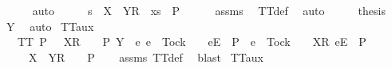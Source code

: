 \ \ \ \ \isamarkupfalse%
\ auto\isanewline
\ \ \isamarkupfalse%
\ \isamarkupfalse%
\ {\isachardoublequoteopen}s\ {\isacharat}\ {\isacharbrackleft}{\isacharbrackleft}X\ {\isasymunion}\ Y{\isacharbrackright}\isactrlsub R{\isacharbrackright}\ {\isacharat}\ xs\ {\isasymin}\ P{\isachardoublequoteclose}\isanewline
\ \ \ \ \isamarkupfalse%
\ assms\ \isamarkupfalse%
\ TT{}{\isacharunderscore}def\ \isamarkupfalse%
\ auto\isanewline
\ \ \isamarkupfalse%
\ \isamarkupfalse%
\ {\isacharquery}thesis\ \isamarkupfalse%
\ Y\ \isamarkupfalse%
\ auto\isanewline
{}\isamarkupfalse%
%
\endisatagproof
{\isafoldproof}%
%
\isadelimproof
\isanewline
%
\endisadelimproof
\isanewline
{}\isamarkupfalse%
\ TT{}{\isacharunderscore}aux{}{\isacharcolon}\isanewline
\ \ \ {\isachardoublequoteopen}TT{}\ P{\isachardoublequoteclose}\ {\isachardoublequoteopen}{\isasymrho}\ {\isacharat}\ {\isacharbrackleft}{\isacharbrackleft}X{\isacharbrackright}\isactrlsub R{\isacharbrackright}\ {\isacharat}\ {\isasymsigma}\ {\isasymin}\ P{\isachardoublequoteclose}\ {\isachardoublequoteopen}Y\ {\isasyminter}\ {\isacharbraceleft}e{\isachardot}\ {\isacharparenleft}e\ {\isasymnoteq}\ Tock\ {\isasymand}\ {\isasymrho}\ {\isacharat}\ {\isacharbrackleft}{\isacharbrackleft}e{\isacharbrackright}\isactrlsub E{\isacharbrackright}\ {\isasymin}\ P{\isacharparenright}\ {\isasymor}\ {\isacharparenleft}e\ {\isacharequal}\ Tock\ {\isasymand}\ {\isasymrho}\ {\isacharat}\ {\isacharbrackleft}{\isacharbrackleft}X{\isacharbrackright}\isactrlsub R{\isacharcomma}\ {\isacharbrackleft}e{\isacharbrackright}\isactrlsub E{\isacharbrackright}\ {\isasymin}\ P{\isacharparenright}\ {\isacharbraceright}\ {\isacharequal}\ {\isacharbraceleft}{\isacharbraceright}{\isachardoublequoteclose}\isanewline
\ \ \ {\isachardoublequoteopen}{\isasymrho}\ {\isacharat}\ {\isacharbrackleft}{\isacharbrackleft}X\ {\isasymunion}\ Y{\isacharbrackright}\isactrlsub R{\isacharbrackright}\ {\isacharat}\ {\isasymsigma}\ {\isasymin}\ P{\isachardoublequoteclose}\isanewline
%
\isadelimproof
\ \ %
\endisadelimproof
%
\isatagproof
{}\isamarkupfalse%
\ assms\ TT{}{\isacharunderscore}def\ \isamarkupfalse%
\ blast%
\endisatagproof
{\isafoldproof}%
%
\isadelimproof
\isanewline
%
\endisadelimproof
\isanewline
{}\isamarkupfalse%
\ TT{}{\isacharunderscore}aux{}{\isacharcolon}\isanewline

